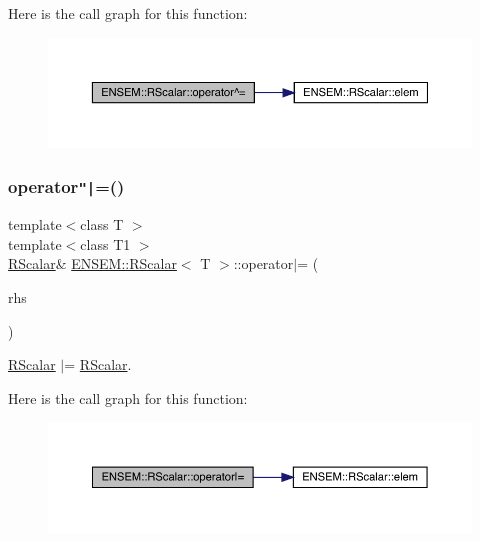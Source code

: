 Here is the call graph for this function\+:
\nopagebreak
\begin{figure}[H]
\begin{center}
\leavevmode
\includegraphics[width=350pt]{d0/d8c/classENSEM_1_1RScalar_ad69bdf7cec58f8ef8a8a42b250d97b25_cgraph}
\end{center}
\end{figure}
\mbox{\label{classENSEM_1_1RScalar_ad5838d1c3d7169f6cc7f9b78fe42ac59}} 
\subsubsection{\texorpdfstring{operator\texttt{"|}=()}{operator|=()}\hspace{0.1cm}{\footnotesize\ttfamily [1/2]}}
{\footnotesize\ttfamily template$<$class T $>$ \\
template$<$class T1 $>$ \\
\mbox{\hyperlink{classENSEM_1_1RScalar}{R\+Scalar}}\& \mbox{\hyperlink{classENSEM_1_1RScalar}{E\+N\+S\+E\+M\+::\+R\+Scalar}}$<$ T $>$\+::operator$\vert$= (\begin{DoxyParamCaption}\item[{const \mbox{\hyperlink{classENSEM_1_1RScalar}{R\+Scalar}}$<$ T1 $>$ \&}]{rhs }\end{DoxyParamCaption})\hspace{0.3cm}{\ttfamily [inline]}}



\mbox{\hyperlink{classENSEM_1_1RScalar}{R\+Scalar}} $\vert$= \mbox{\hyperlink{classENSEM_1_1RScalar}{R\+Scalar}}. 

Here is the call graph for this function\+:
\nopagebreak
\begin{figure}[H]
\begin{center}
\leavevmode
\includegraphics[width=350pt]{d0/d8c/classENSEM_1_1RScalar_ad5838d1c3d7169f6cc7f9b78fe42ac59_cgraph}
\end{center}
\end{figure}
\mbox{\label{classENSEM_1_1RScalar_ad5838d1c3d7169f6cc7f9b78fe42ac59}} 
